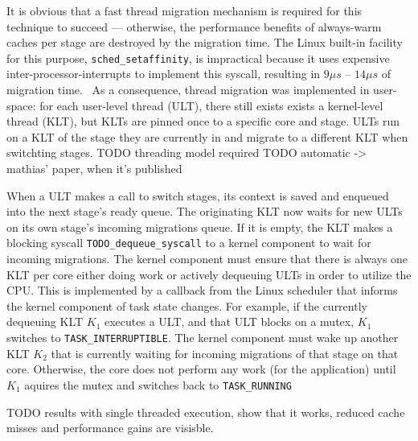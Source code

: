 \documentclass[12pt,a4paper]{book}
\begin{document}
It is obvious that a fast thread migration mechanism is required for this technique to succeed
--- otherwise, the performance benefits of always-warm caches per stage are destroyed by the migration time.
The Linux built-in facility for this purpose, \texttt{sched\_setaffinity}, is impractical because it uses
expensive inter-processor-interrupts to implement this syscall, resulting in $9\mu s$ -- $14\mu s$ of migration time.~\cite{sodaspr}%
As a consequence, thread migration was implemented in user-space:
for each user-level thread (ULT), there still exists exists a kernel-level thread (KLT),
but KLTs are pinned once to a specific core and stage.
ULTs run on a KLT of the stage they are currently in and migrate to a different KLT when switchting stages.
TODO threading model required
TODO automatic -> mathias' paper, when it's published

When a ULT makes a call to switch stages, its context is saved and enqueued into the next stage's ready queue.
The originating KLT now waits for new ULTs on its own stage's incoming migrations queue.
If it is empty, the KLT makes a blocking syscall \texttt{TODO\_dequeue\_syscall} to a kernel component to wait for incoming migrations.
The kernel component must ensure that there is always one KLT per core either doing work or actively dequeuing ULTs in order to utilize the CPU.
This is implemented by a callback from the Linux scheduler that informs the kernel component of task state changes.
For example, if the currently dequeuing KLT $K_1$ executes a ULT, and that ULT blocks on a mutex, $K_1$ switches to \texttt{TASK\_INTERRUPTIBLE}.
The kernel component must wake up another KLT $K_2$ that is currently waiting for incoming migrations of that stage on that core.
Otherwise, the core does not perform any work (for the application) until $K_1$ aquires the mutex and switches back to \texttt{TASK\_RUNNING}

TODO results with single threaded execution, show that it works, reduced cache misses and performance gains are visisble.
\end{document}
